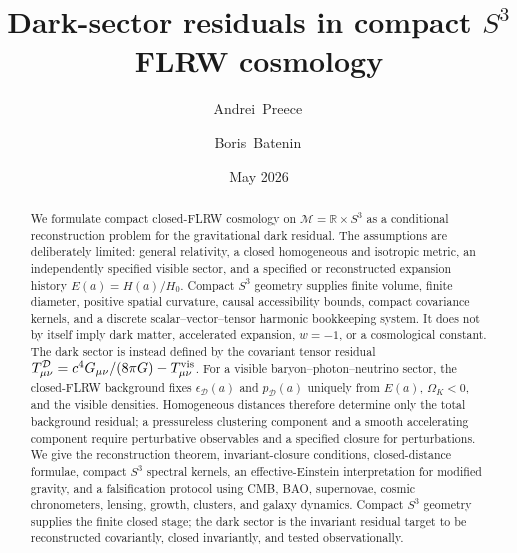 \documentclass[
  aps,
  prd,
  reprint,
  superscriptaddress,
  nofootinbib,
  floatfix,
  longbibliography
]{revtex4-2}
\theoremstyle{plain}
\theoremstyle{definition}
\theoremstyle{remark}
\newcommand{\RR}{\mathbb R}
\newcommand{\M}{\mathcal M}
\newcommand{\D}{\mathcal D}
\begin{document}
\title{Dark-sector residuals in compact \texorpdfstring{$S^3$}{S3} FLRW cosmology}

\author{Andrei~Preece\,}

\author{Boris~Batenin\,}

\date{May 2026}

\begin{abstract}
We formulate compact closed-FLRW cosmology on $\M=\RR\times S^3$ as a
conditional reconstruction problem for the gravitational dark residual.  The
assumptions are deliberately limited: general relativity, a closed homogeneous
and isotropic metric, an independently specified visible sector, and a specified
or reconstructed expansion history $E(a)=H(a)/H_0$.  Compact $S^3$ geometry
supplies finite volume, finite diameter, positive spatial curvature, causal
accessibility bounds, compact covariance kernels, and a discrete
scalar--vector--tensor harmonic bookkeeping system.  It does not by itself
imply dark matter, accelerated expansion, $w=-1$, or a cosmological constant.
The dark sector is instead defined by the covariant tensor residual
$T^\D_{\mu\nu}=c^4G_{\mu\nu}/(8\pi G)-T^{\rm vis}_{\mu\nu}$.  For a visible
baryon--photon--neutrino sector, the closed-FLRW background fixes
$\epsilon_\D(a)$ and $p_\D(a)$ uniquely from $E(a)$, $\Omega_K<0$, and the
visible densities.  Homogeneous distances therefore determine only the total
background residual; a pressureless clustering component and a smooth
accelerating component require perturbative observables and a specified closure
for perturbations.  We give the reconstruction theorem, invariant-closure
conditions, closed-distance formulae, compact $S^3$ spectral kernels, an
effective-Einstein interpretation for modified gravity, and a falsification
protocol using CMB, BAO, supernovae, cosmic chronometers, lensing, growth,
clusters, and galaxy dynamics.  Compact $S^3$ geometry supplies the finite
closed stage; the dark sector is the invariant residual target to be
reconstructed covariantly, closed invariantly, and tested observationally.
\end{abstract}

\maketitle
\end{document}
